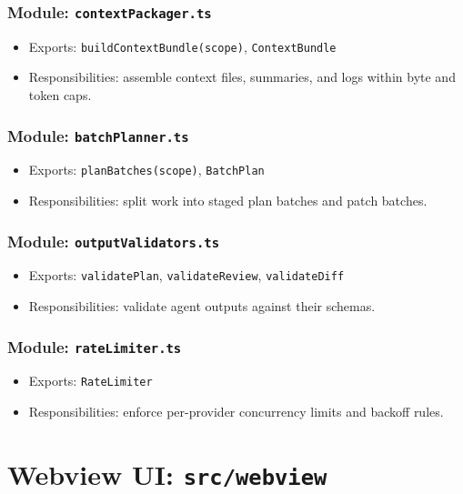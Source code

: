 \documentclass[11pt]{article}
\begin{document}
\subsubsection*{Module: \texttt{contextPackager.ts}}
\begin{itemize}[noitemsep]
  \item Exports: \texttt{buildContextBundle(scope)}, \texttt{ContextBundle}
  \item Responsibilities: assemble context files, summaries, and logs within byte and token caps.
\end{itemize}

\subsubsection*{Module: \texttt{batchPlanner.ts}}
\begin{itemize}[noitemsep]
  \item Exports: \texttt{planBatches(scope)}, \texttt{BatchPlan}
  \item Responsibilities: split work into staged plan batches and patch batches.
\end{itemize}

\subsubsection*{Module: \texttt{outputValidators.ts}}
\begin{itemize}[noitemsep]
  \item Exports: \texttt{validatePlan}, \texttt{validateReview}, \texttt{validateDiff}
  \item Responsibilities: validate agent outputs against their schemas.
\end{itemize}

\subsubsection*{Module: \texttt{rateLimiter.ts}}
\begin{itemize}[noitemsep]
  \item Exports: \texttt{RateLimiter}
  \item Responsibilities: enforce per-provider concurrency limits and backoff rules.
\end{itemize}

\section{Webview UI: \texttt{src/webview}}
\end{document}
